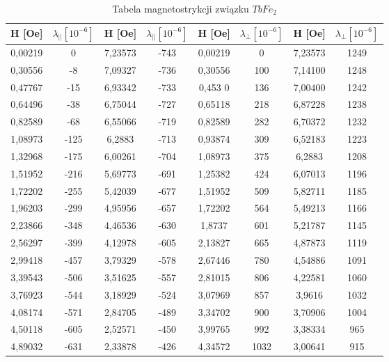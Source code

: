 \documentclass[a4paper,12pt]{article}
\numberwithin{equation}{section}
\begin{document}
\begin{appendices}


  \label{TbMagnetoTab}
  \scriptsize
  \begin{longtable}{|c|c|c|c|c|c|c|c|}
\caption{Tabela magnetostrykcji związku $TbFe_2$}\\
\hline
H [Oe]	&	$\lambda_{||} [10^{-6}]	$ 	&	H [Oe]	&	$\lambda_{||}  [10^{-6}]	$	&	H [Oe]	&	$\lambda_{\perp}  [10^{-6}]$		&	H [Oe]	&	$\lambda_{\perp} [10^{-6}]$	\\\hline\hline
0,00219	&	0		&	7,23573	&	-743		&	0,00219	&	0		&	7,23573	&	1249	\\\hline
0,30556	&	-8		&	7,09327	&	-736		&	0,30556	&	100		&	7,14100	&	1248 	\\\hline
0,47767	&	-15		&	6,93342	&	-733		&	0,453	0	&	136		&	7,00400	&	1242	\\\hline
0,64496	&	-38		&	6,75044	&	-727		&	0,65118	&	218		&	6,87228	&	1238	\\\hline
0,82589	&	-68		&	6,55066	&	-719		&	0,82589	&	282		&	6,70372	&	1232	\\\hline
1,08973	&	-125		&	6,2883	&	-713		&	0,93874	&	309		&	6,52183	&	1223	\\\hline
1,32968	&	-175		&	6,00261	&	-704		&	1,08973	&	375		&	6,2883	&	1208	\\\hline
1,51952	&	-216		&	5,69773	&	-691		&	1,25382	&	424		&	6,07013	&	1196	\\\hline
1,72202	&	-255		&	5,42039	&	-677		&	1,51952	&	509		&	5,82711	&	1185	\\\hline
1,96203	&	-299		&	4,95956	&	-657		&	1,72202	&	564		&	5,49213	&	1166	\\\hline
2,23866	&	-348		&	4,46536	&	-630		&	1,8737	&	601		&	5,21787	&	1145	\\\hline
2,56297	&	-399		&	4,12978	&	-605		&	2,13827	&	665		&	4,87873	&	1119	\\\hline
2,99418	&	-457		&	3,79329	&	-578		&	2,67446	&	780		&	4,54886	&	1091	\\\hline
3,39543	&	-506		&	3,51625	&	-557		&	2,81015	&	806		&	4,22581	&	1060	\\\hline
3,76923	&	-544		&	3,18929	&	-524		&	3,07969	&	857		&	3,9616	&	1032	\\\hline
4,08174	&	-571		&	2,84705	&	-489		&	3,34702	&	900		&	3,70906	&	1004	\\\hline
4,50118	&	-605		&	2,52571	&	-450		&	3,99765	&	992		&	3,38334	&	965	\\\hline
4,89032	&	-631		&	2,33878	&	-426		&	4,34572	&	1032		&	3,00641	&	915	\\\hline

\end{longtable}
\end{appendices}
\end{document}
